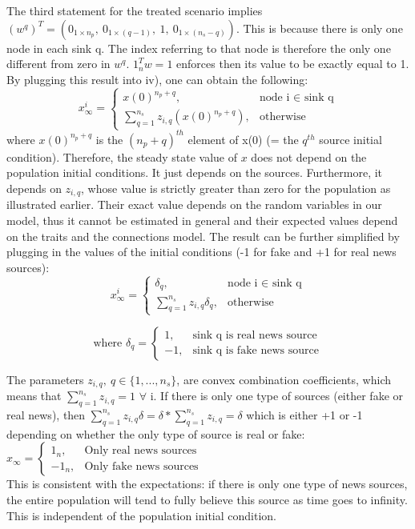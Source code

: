 The third statement for the treated scenario implies $(w^q)^T = (0_{1 \times n_p},\ 0_{1 \times (q-1)},\ 1,\ 0_{1 \times (n_s-q)})$. This is because there is only one node in each sink q. The index referring to that node is therefore the only one different from zero in $w^q$. $1_n^Tw=1$ enforces then its value to be exactly equal to 1. By plugging this result into iv), one can obtain the following:
$$
x_{\infty}^i = 
\begin{cases}
	x(0)^{n_p+q},& \text{node i $\in$ sink q}\\
	\sum_{q=1}^{n_s} z_{i,q}(x(0)^{n_p+q}), & \text{otherwise}
\end{cases}
$$
where $x(0)^{n_p+q}$ is the $(n_p+q)^{th}$ element of x(0) (= the $q^{th}$ source initial condition). Therefore, the steady state value of $x$ does not depend on the population initial conditions. It just depends on the sources. Furthermore, it depends on $z_{i,q}$, whose value is strictly greater than zero for the population as  illustrated earlier. Their exact value depends on the random variables in our model, thus it cannot be estimated in general and their expected values depend on the traits and the connections model. \newline
The result can be further simplified by plugging in the values of the initial conditions (-1 for fake and +1 for real news sources):
$$
x_{\infty}^i = 
\begin{cases}
\delta_q,& \text{node i $\in$ sink q}\\
\sum_{q=1}^{n_s} z_{i,q}\delta_q, & \text{otherwise}
\end{cases}
$$

$$ \text{where }
\delta_q = 
\begin{cases}
1,& \text{sink q is real news source}\\
-1,& \text{sink q is fake news source}
\end{cases}
$$


The parameters $z_{i,q},\ q\in\{1,...,n_s\}$, are convex combination coefficients, which means that $\sum_{q=1}^{n_s} z_{i,q} = 1$ $\forall$ i.
If there is only one type of sources (either fake or real news), then $\sum_{q=1}^{n_s} z_{i,q}\delta = \delta*\sum_{q=1}^{n_s} z_{i,q} = \delta$ which is either +1 or -1 depending on whether the only type of source is real or fake: 
$x_\infty = 
\begin{cases}
1_n,& \text{Only real news sources}\\
-1_n,& \text{Only fake news sources}
\end{cases}$
\\This is consistent with the expectations: if there is only one type of news sources, the entire population will tend to fully believe this source as time goes to infinity. This is independent of the population initial condition.
